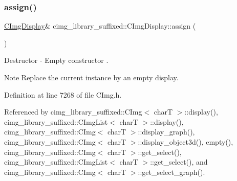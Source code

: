 \subsubsection{\texorpdfstring{assign()}{assign()}}
{\footnotesize\ttfamily \hyperlink{structcimg__library__suffixed_1_1CImgDisplay}{C\+Img\+Display}\& cimg\+\_\+library\+\_\+suffixed\+::\+C\+Img\+Display\+::assign (\begin{DoxyParamCaption}{ }\end{DoxyParamCaption})\hspace{0.3cm}{\ttfamily [inline]}}



Destructor -\/ Empty constructor . 

\begin{DoxyNote}{Note}
Replace the current instance by an empty display. 
\end{DoxyNote}


Definition at line 7268 of file C\+Img.\+h.



Referenced by cimg\+\_\+library\+\_\+suffixed\+::\+C\+Img$<$ char\+T $>$\+::display(), cimg\+\_\+library\+\_\+suffixed\+::\+C\+Img\+List$<$ char\+T $>$\+::display(), cimg\+\_\+library\+\_\+suffixed\+::\+C\+Img$<$ char\+T $>$\+::display\+\_\+graph(), cimg\+\_\+library\+\_\+suffixed\+::\+C\+Img$<$ char\+T $>$\+::display\+\_\+object3d(), empty(), cimg\+\_\+library\+\_\+suffixed\+::\+C\+Img$<$ char\+T $>$\+::get\+\_\+select(), cimg\+\_\+library\+\_\+suffixed\+::\+C\+Img\+List$<$ char\+T $>$\+::get\+\_\+select(), and cimg\+\_\+library\+\_\+suffixed\+::\+C\+Img$<$ char\+T $>$\+::get\+\_\+select\+\_\+graph().

